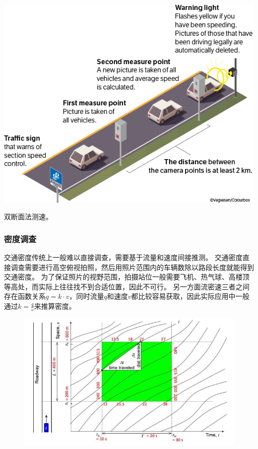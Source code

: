 \begin{marginfigure}
    \includegraphics[width=\linewidth]{images/section-speed.png}
    \caption{双断面法测速。}
    \label{fig:section-speed}
\end{marginfigure}

\subsubsection{密度调查}
交通密度传统上一般难以直接调查，需要基于流量和速度间接推测。
交通密度直接调查需要进行高空俯视拍照，然后用照片范围内的车辆数除以路段长度就能得到交通密度。
为了保证照片的视野范围，拍摄站位一般需要飞机、热气球、高楼顶等高处，而实际上往往找不到合适位置，因此不可行。
另一方面流密速三者之间存在函数关系$q=k\cdot v$，同时流量$q$和速度$v$都比较容易获取，因此实际应用中一般通过$k=\frac{q}{v}$来推算密度。

\begin{figure}
    \ContinuedFloat* %
    \includegraphics[width=\linewidth]{images/flow-density-speed.jpeg}
    \label{fig:trajectory}
\end{figure}
